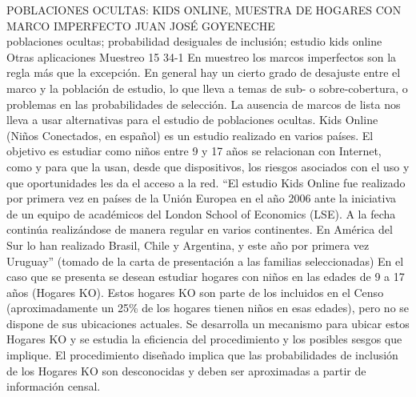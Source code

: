 \A
{POBLACIONES OCULTAS: KIDS ONLINE, MUESTRA DE HOGARES CON MARCO IMPERFECTO}
{JUAN JOSÉ GOYENECHE}
{
\\
}
{poblaciones ocultas; probabilidad desiguales de inclusión; estudio kids online} 
 {Otras aplicaciones} 
 {Muestreo} 
 {15} 
 {34-1}
{En muestreo los marcos imperfectos son la regla más que la excepción. En general hay un cierto grado de desajuste entre el marco y la población de estudio, lo que lleva a temas de sub- o sobre-cobertura, o problemas en las probabilidades de selección. La ausencia de marcos de lista nos lleva a usar alternativas para el estudio de poblaciones ocultas. Kids Online (Niños Conectados, en español) es un estudio realizado en varios países. El objetivo es estudiar como niños entre 9 y 17 años se relacionan con Internet, como y para que la usan, desde que dispositivos, los riesgos asociados con el uso y que oportunidades les da el acceso a la red. “El estudio Kids Online fue realizado por primera vez en países de la Unión Europea en el año 2006 ante la iniciativa de un equipo de académicos del London School of Economics (LSE). A la fecha continúa realizándose de manera regular en varios continentes. En América del Sur lo han realizado Brasil, Chile y Argentina, y este año por primera vez Uruguay” (tomado de la carta de presentación a las familias seleccionadas) En el caso que se presenta se desean estudiar hogares con niños en las edades de 9 a 17 años (Hogares KO). Estos hogares KO son parte de los incluidos en el Censo (aproximadamente un 25\% de los hogares tienen niños en esas edades), pero no se dispone de sus ubicaciones actuales. Se desarrolla un mecanismo para ubicar estos Hogares KO y se estudia la eficiencia del procedimiento y los posibles sesgos que implique. El procedimiento diseñado implica que las probabilidades de inclusión de los Hogares KO son desconocidas y deben ser aproximadas a partir de información censal.}
